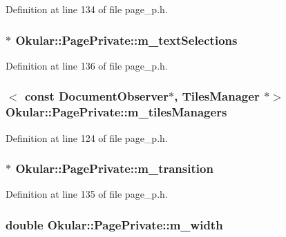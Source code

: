 Definition at line 134 of file page\+\_\+p.\+h.

\hypertarget{classOkular_1_1PagePrivate_a98312e1819fa37a313852accd9bd47f8}{
\subsubsection[{m\+\_\+text\+Selections}]{$\ast$ Okular\+::\+Page\+Private\+::m\+\_\+text\+Selections}}\label{classOkular_1_1PagePrivate_a98312e1819fa37a313852accd9bd47f8}


Definition at line 136 of file page\+\_\+p.\+h.

\hypertarget{classOkular_1_1PagePrivate_a4735784ca4e23f35a55250e827f62d67}{
\subsubsection[{m\+\_\+tiles\+Managers}]{$<$ const {\bf Document\+Observer}$\ast$, {\bf Tiles\+Manager} $\ast$$>$ Okular\+::\+Page\+Private\+::m\+\_\+tiles\+Managers}}\label{classOkular_1_1PagePrivate_a4735784ca4e23f35a55250e827f62d67}


Definition at line 124 of file page\+\_\+p.\+h.

\hypertarget{classOkular_1_1PagePrivate_aed53103e51c46cfa19d908ad17d4dc64}{
\subsubsection[{m\+\_\+transition}]{$\ast$ Okular\+::\+Page\+Private\+::m\+\_\+transition}}\label{classOkular_1_1PagePrivate_aed53103e51c46cfa19d908ad17d4dc64}


Definition at line 135 of file page\+\_\+p.\+h.

\hypertarget{classOkular_1_1PagePrivate_a3350b64842d008c59422f1b4fe6d7243}{
\subsubsection[{m\+\_\+width}]{\setlength{\rightskip}{0pt plus 5cm}double Okular\+::\+Page\+Private\+::m\+\_\+width}}\label{classOkular_1_1PagePrivate_a3350b64842d008c59422f1b4fe6d7243}


